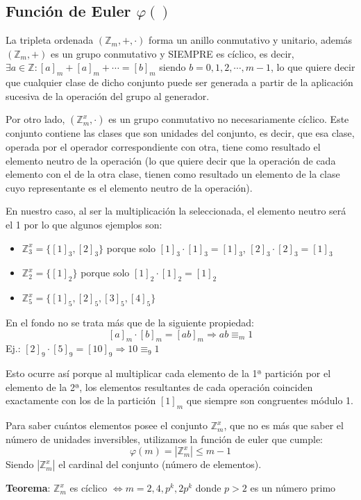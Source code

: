 \documentclass[10pt,a4paper,openright]{book}
\theoremstyle{break}
\begin{document}
\subsection{Función de Euler $\varphi ()$}
La tripleta ordenada $(\mathbb Z_m,+,\cdot)$ forma un anillo conmutativo y unitario, además $(\mathbb Z_m, +)$ es un grupo conmutativo y SIEMPRE es cíclico, es decir, $\exists a\in \mathbb Z : [a]_m+[a]_m+\cdots=[b]_m$ siendo $b=0,1,2,\cdots,m-1$, lo que quiere decir que cualquier clase de dicho conjunto puede ser generada a partir de la aplicación sucesiva de la operación del grupo al generador.\par
Por otro lado, $(\mathbb Z_m^x, \cdot)$ es un grupo conmutativo no necesariamente cíclico. Este conjunto contiene las clases que son unidades del conjunto, es decir, que esa clase, operada por el operador correspondiente con otra, tiene como resultado el elemento neutro de la operación (lo que quiere decir que la operación de cada elemento con el de la otra clase, tienen como resultado un elemento de la clase cuyo representante es el elemento neutro de la operación).\par
En nuestro caso, al ser la multiplicación la seleccionada, el elemento neutro será el 1 por lo que algunos ejemplos son:
\begin{itemize}
\item $\mathbb Z_3^x=\{[1]_3, [2]_3\}$ porque solo $[1]_3\cdot[1]_3=[1]_3$, $[2]_3\cdot[2]_3=[1]_3 $
\item $\mathbb Z_2^x=\{\left[1\right]_2\}$ porque solo $[1]_2\cdot [1]_2=[1]_2$
\item $\mathbb Z_5^x=\{[1]_5, [2]_5, [3]_5, [4]_5\}$
\end{itemize}
En el fondo no se trata más que de la siguiente propiedad:
$$[a]_m\cdot[b]_m=[ab]_m \Rightarrow ab\equiv_m 1$$
Ej.: $[2]_9\cdot[5]_9=[10]_9\Rightarrow 10\equiv_9 1$\par
Esto ocurre así porque al multiplicar cada elemento de la 1ª partición por el elemento de la 2ª, los elementos resultantes de cada operación coinciden exactamente con los de la partición $[1]_m$ que siempre son congruentes módulo 1.\par
Para saber cuántos elementos posee el conjunto $\mathbb Z_m^x$, que no es más que saber el número de unidades inversibles, utilizamos la función de euler que cumple:
$$\varphi (m)=|\mathbb Z_m^x|\leq m-1$$
Siendo $|\mathbb Z_m^x|$ el cardinal del conjunto (número de elementos).

\textbf{Teorema}: $\mathbb Z_m^x$ es cíclico $\Leftrightarrow m=2,4,p^k, 2p^k$ donde $p>2$ es un número primo
\end{document}
